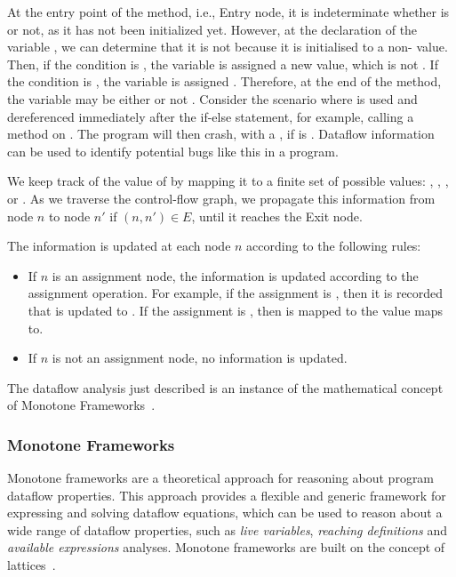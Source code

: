 At the entry point of the method, i.e., Entry node,
it is indeterminate whether  is  or not, as it has not been initialized yet.
However, at the declaration of the variable , we can determine that it is
not  because it is initialised to a non-
value. Then, if the condition  is , the
variable  is assigned a new value, which is not . If the condition
is , the variable  is assigned . Therefore, at the
end of the method, the variable  may be either  or not .
Consider the scenario where  is used and dereferenced immediately after the
if-else statement, for example, calling a method on . The program will then crash, 
with a , if  is . 
Dataflow information can be used to identify potential bugs like this in a program.

We keep track of the value of  by mapping it to a finite set of possible values:
, , , or .
As we traverse the control-flow graph, we propagate this information from node
$n$ to node $n'$ if $(n,n')\in E$, until it reaches the Exit node.

The information is updated at each node $n$ according to the following rules:
\begin{itemize}
\item If $n$ is an assignment node, the information is updated according to the
assignment operation. For example, if the assignment is , then
it is recorded that  is updated to . If the assignment is , then
 is mapped to the value  maps to.
\item If $n$ is not an assignment node, no information is updated.
\end{itemize}

The dataflow analysis just described is an instance of the mathematical concept of
Monotone Frameworks~\cite{Nielson2010Principles}.

\subsubsection*{Monotone Frameworks}
\label{sec:monotoneframeworks}
Monotone frameworks are a theoretical approach for reasoning
about program dataflow properties.
This approach provides a flexible and generic framework for expressing and solving
dataflow equations, which can be used to reason about a wide range of dataflow
properties, such as \emph{live variables}, \emph{reaching definitions} and \emph{available expressions} analyses.
Monotone frameworks are built on the concept of lattices~\cite{Donnellan1968}.

